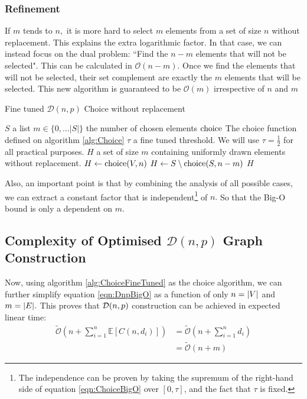 \subsubsection{Refinement}
If $m$ tends to $n,$ it is more hard to select $m$ elements from a set of size $n$ without replacement. This explains the extra logarithmic factor.
\newline In that case, we can instead focus on the dual problem: ``Find the $n-m$ elements that will not be selected". This can be calculated in $\mathcal{O}(n-m).$
\newline Once we find the elements that will not be selected, their set complement are exactly the $m$ elements that will be selected. This new algorithm is guaranteed to be $\mathcal{O}(m)$ irrespective of $n$ and $m$
\begin{algorithm}
	\caption{Fine tuned $\mathcal{D}(n,p)$ Choice without replacement }\label{alg:ChoiceFineTuned}
	\begin{algorithmic}
		\Require $S$ a list
		\Require $m\in\{0,\dots \lvert S \rvert\}$ the number of chosen elements
		\Require $\operatorname{choice}$ The choice function defined on algorithm \ref{alg:Choice}
		\Require $\tau$ a fine tuned threshold. We will use $\tau=\frac{1}{2}$ for all practical purposes.
		\Ensure $H$ a set of size $m$ containing uniformly drawn elements without replacement. 
			\State $H\leftarrow \operatorname{choice}(V,n)$
		\Else
			\State $H\leftarrow S\setminus \operatorname{choice}(S,n-m)$
		\EndIf
		\State \Return $H$
	\end{algorithmic}
\end{algorithm}
\FloatBarrier
Also, an important point is that by combining the analysis of all possible cases, we can extract a constant factor that is independent\footnote{The independence can be proven by taking the supremum of the right-hand side of equation \eqref{eqn:ChoiceBigO} over $[0,\tau]$, and the fact that $\tau$ is fixed.} of $n.$ So that the Big-O bound is only a dependent on $m$.
\subsection{Complexity of Optimised $\mathcal{D}(n,p)$ Graph Construction}
Now, using algorithm \ref{alg:ChoiceFineTuned} as the choice algorithm, we can further simplify equation \eqref{eqn:DnpBigO} as a function of only $n=\lvert V\rvert$ and $m=\lvert E\rvert.$
\newline This proves that $\mathcal{D}(n,p)$ construction can be achieved in expected linear time:
\begin{align*}
	\tilde{\mathcal{O}}\left(n+\sum_{i=1}^n\mathbb{E}[C(n,d_i)]\right)  &= \tilde{\mathcal{O}}\left(n+\sum_{i=1}^nd_i\right) \\
	&=\tilde{\mathcal{O}}\left(n+m\right)
\end{align*}

